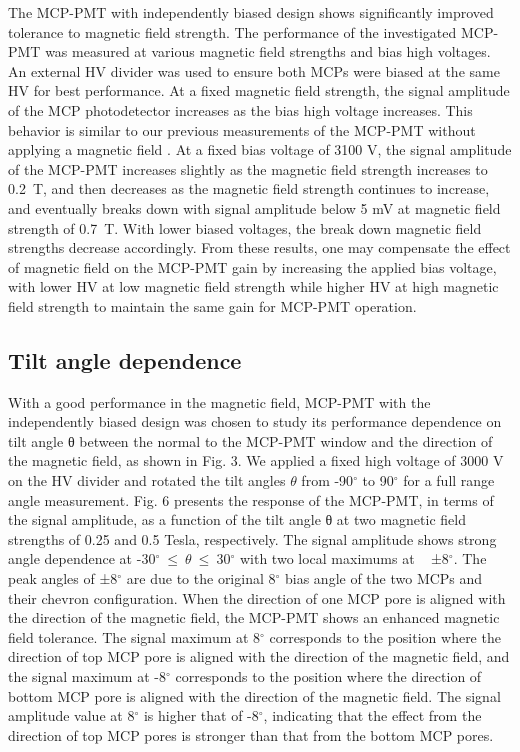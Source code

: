 \documentclass[preprint,5p]{elsarticle}
\begin{document}
The MCP-PMT with independently biased design shows significantly improved 
tolerance to magnetic field strength. The performance of the investigated 
MCP-PMT was measured at various magnetic field strengths and bias high 
voltages. An external HV divider was used to ensure both MCPs were biased at 
the same HV for best performance. At a fixed magnetic field strength, the 
signal amplitude of the MCP photodetector increases as the bias high voltage 
increases. This behavior is similar to our previous measurements of the MCP-PMT 
without applying a magnetic field \cite{21}. At a fixed bias voltage of 3100 V, 
the signal amplitude of the MCP-PMT increases slightly as the magnetic field 
strength increases to 0.2~T, and then decreases as the magnetic field strength 
continues to increase, and eventually breaks down with signal amplitude below 5 
mV at magnetic field strength of 0.7~T. With lower biased voltages, the break 
down magnetic field strengths decrease accordingly. From these results, one may 
compensate the effect of magnetic field on the MCP-PMT gain by increasing the 
applied bias voltage, with lower HV at low magnetic field strength while higher 
HV at high magnetic field strength to maintain the same gain for MCP-PMT 
operation. 



\subsection{Tilt angle dependence} \label{}
With a good performance in the magnetic field, MCP-PMT with the independently 
biased design was chosen to study its performance dependence on tilt angle θ 
between the normal to the MCP-PMT window and the direction of the magnetic 
field, as shown in Fig. 3. We applied a fixed high voltage of 3000 V on the HV 
divider and rotated the tilt angles $\theta$ from -90$^{\circ}$ to 90$^{\circ}$ 
for a full range angle measurement. Fig. 6 presents the response of the 
MCP-PMT, in terms of the signal amplitude, as a function of the tilt angle θ at 
two magnetic field strengths of 0.25 and 0.5 Tesla, respectively.  The signal 
amplitude shows strong angle dependence at 
-30$^{\circ}~\leq~\theta~\leq~$30$^{\circ}$ with two local maximums at ~ 
±8$^{\circ}$.  The peak angles of ±8$^{\circ}$ are due to the original 
8$^{\circ}$ bias angle of the two MCPs and their chevron configuration.  When 
the direction of one MCP pore is aligned with the direction of the magnetic 
field, the MCP-PMT shows an enhanced magnetic field tolerance. The signal 
maximum at 8$^{\circ}$ corresponds to the position where the direction of top 
MCP pore is aligned with the direction of the magnetic field, and the signal 
maximum at -8$^{\circ}$ corresponds to the position where the direction of 
bottom MCP pore is aligned with the direction of the magnetic field. The signal 
amplitude value at 8$^{\circ}$ is higher that of -8$^{\circ}$, indicating that 
the effect from the direction of top MCP pores is stronger than that from the 
bottom MCP pores.
\end{document}
